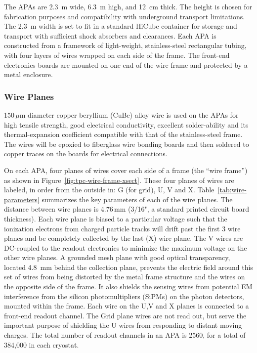 The APAs are 2.3~m wide, 6.3~m high, and 12~cm thick. The height is chosen for fabrication purposes and compatibility with underground transport limitations. The 2.3~m width is set to fit in a standard HiCube container for storage and transport with sufficient shock absorbers and clearances. 
Each APA is constructed from a framework of light-weight, stainless-steel rectangular tubing, with four layers of wires wrapped on each side of the frame. The front-end electronics boards are mounted on one end of the wire frame and protected by a metal enclosure.  


\subsubsection{Wire Planes}
\label{subsec:fd-ref-wireplanes}

150\,$\mu$m diameter copper beryllium (CuBe) alloy wire is used on the APAs for high tensile strength, good electrical conductivity, excellent solder-ability and its thermal-expansion coefficient compatible with that of the stainless-steel frame.  The wires will be epoxied to fiberglass wire bonding boards and then soldered to copper traces on the boards for electrical connections.

On each APA, four planes of wires cover each side of a frame (the ``wire frame'') as shown in Figure~\ref{fig:tpc-wire-frame-xsect}.
These four planes of wires are labeled, in order from the outside in: G (for grid), U, V and X.  
Table~\ref{tab:wire-parameters} summarizes  the key parameters of each of the wire planes.  The distance between wire planes is 4.76\,mm (3/16", a standard printed circuit board thickness).  Each wire plane is biased to a particular voltage such that the ionization electrons from charged particle tracks will drift past the first 3 wire planes and be completely collected by the last (X) wire plane.  The V wires are DC-coupled to the readout electronics to minimize the maximum voltage on the other wire planes.
A grounded mesh plane with good optical transparency, located 4.8~mm behind the collection plane, prevents the electric field around this set of wires from being distorted by the metal frame structure and the wires on the opposite side of the frame. It also shields the sensing wires from potential EM interference from the silicon photomultipliers (SiPMs) on the photon detectors, mounted within the frame.  
Each wire on the U,V and X planes is connected to a front-end readout channel. The Grid plane wires are not read out, but serve the important purpose of shielding the U wires from responding to distant moving charges. The total number of readout channels in an APA is 2560, for a total of 384,000 in each cryostat.



